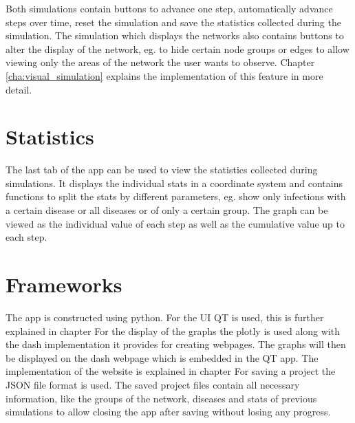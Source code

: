 Both simulations contain buttons to advance one step, automatically advance steps over time,
reset the simulation and save the statistics collected during the simulation. The simulation
which displays the networks also contains buttons to alter the display of the network, eg. to hide
certain node groups or edges to allow viewing only the areas of the network the user wants to observe.
Chapter \ref{cha:visual_simulation} explains the implementation of this feature in more detail.

\section{Statistics}
The last tab of the app can be used to view the statistics collected during simulations.
It displays the individual stats in a coordinate system and contains functions to split
the stats by different parameters, eg. show only infections with a certain disease or all
diseases or of only a certain group. The graph can be viewed as the individual value of each
step as well as the cumulative value up to each step.

\section{Frameworks}
The app is constructed using python. For the UI QT \cite{qt} is used, this is further explained
in chapter %
For the display of the graphs the plotly \cite{plotly} is used along with the dash implementation
it provides for creating webpages. The graphs will then be displayed on the dash webpage
which is embedded in the QT app. The implementation of the website is explained in chapter %
For saving a project the JSON file format is used. The saved project files contain all 
necessary information, like the groups of the network, diseases and stats of previous simulations
to allow closing the app after saving without losing any progress.

